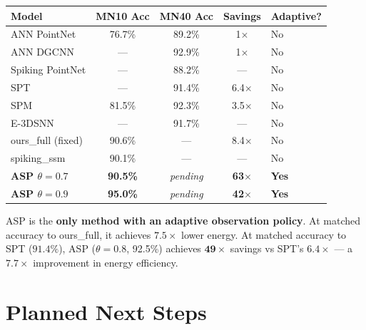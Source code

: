 \documentclass[11pt,a4paper]{article}
\begin{document}
\begin{center}
\begin{tabular}{lcccl}
\toprule
\textbf{Model} & \textbf{MN10 Acc} & \textbf{MN40 Acc} & \textbf{Savings} & \textbf{Adaptive?} \\
\midrule
ANN PointNet & 76.7\% & 89.2\% & 1$\times$ & No \\
ANN DGCNN & --- & 92.9\% & 1$\times$ & No \\
Spiking PointNet & --- & 88.2\% & --- & No \\
SPT & --- & 91.4\% & 6.4$\times$ & No \\
SPM & 81.5\% & 92.3\% & 3.5$\times$ & No \\
E-3DSNN & --- & 91.7\% & --- & No \\
ours\_full (fixed) & 90.6\% & --- & 8.4$\times$ & No \\
spiking\_ssm & 90.1\% & --- & --- & No \\
\midrule
\textbf{ASP $\theta=0.7$} & \textbf{90.5\%} & \textit{pending} & \textbf{63$\times$} & \textbf{Yes} \\
\textbf{ASP $\theta=0.9$} & \textbf{95.0\%} & \textit{pending} & \textbf{42$\times$} & \textbf{Yes} \\
\bottomrule
\end{tabular}
\end{center}

ASP is the \textbf{only method with an adaptive observation policy}. At matched accuracy to
ours\_full, it achieves $7.5\times$ lower energy. At matched accuracy to SPT ($91.4\%$),
ASP ($\theta=0.8$, 92.5\%) achieves $\mathbf{49\times}$ savings vs SPT's $6.4\times$ ---
a $\mathbf{7.7\times}$ improvement in energy efficiency.

\section{Planned Next Steps}
\end{document}
